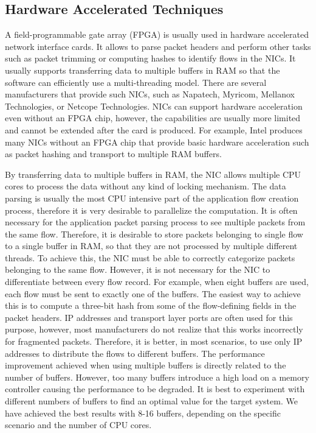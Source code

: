 \subsection{Hardware Accelerated Techniques}

A field-programmable gate array (FPGA) is usually used in hardware accelerated network interface cards. It allows to parse packet headers and perform other tasks such as packet trimming or computing hashes to identify flows in the NICs. It usually supports transferring data to multiple buffers in RAM so that the software can efficiently use a multi-threading model. There are several manufacturers that provide such NICs, such as Napatech, Myricom, Mellanox Technologies, or Netcope Technologies. NICs can support hardware acceleration even without an FPGA chip, however, the capabilities are usually more limited and cannot be extended after the card is produced. For example, Intel produces many NICs without an FPGA chip that provide basic hardware acceleration such as packet hashing and transport to multiple RAM buffers.

By transferring data to multiple buffers in RAM, the NIC allows multiple CPU cores to process the data without any kind of locking mechanism. The data parsing is usually the most CPU intensive part of the application flow creation process, therefore it is very desirable to parallelize the computation. It is often necessary for the application packet parsing process to see multiple packets from the same flow. Therefore, it is desirable to store packets belonging to single flow to a single buffer in RAM, so that they are not processed by multiple different threads. To achieve this, the NIC must be able to correctly categorize packets belonging to the same flow. However, it is not necessary for the NIC to differentiate between every flow record. For example, when eight buffers are used, each flow must be sent to exactly one of the buffers. The easiest way to achieve this is to compute a three-bit hash from some of the flow-defining fields in the packet headers. IP addresses and transport layer ports are often used for this purpose, however, most manufacturers do not realize that this works incorrectly for fragmented packets. Therefore, it is better, in most scenarios, to use only IP addresses to distribute the flows to different buffers. The performance improvement achieved when using multiple buffers is directly related to the number of buffers. However, too many buffers introduce a high load on a memory controller causing the performance to be degraded. It is best to experiment with different numbers of buffers to find an optimal value for the target system. We have achieved the best results with 8-16 buffers, depending on the specific scenario and the number of CPU cores.


